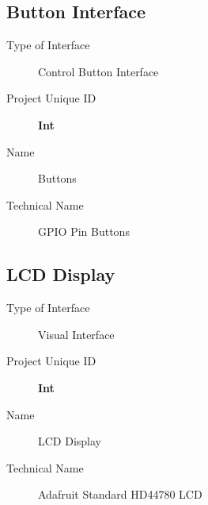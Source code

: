 \subsection{Button Interface}
\label{loc:InterfaceFour}
%

\begin{description}
    \item[Type of Interface] Control Button Interface
    \item[Project Unique ID] \textbf{Int}
    \item[Name] Buttons
    \item[Technical Name] GPIO Pin Buttons
\end{description}

\subsection{LCD Display}
\label{loc:InterfaceFive}
%

\begin{description}
    \item[Type of Interface] Visual Interface
    \item[Project Unique ID] \textbf{Int}
    \item[Name] LCD Display
    \item[Technical Name] Adafruit Standard HD44780 LCD
\end{description}
